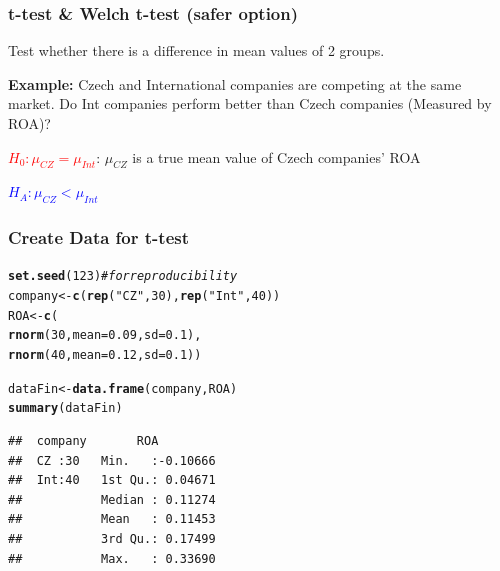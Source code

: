 \documentclass[12pt]{beamer}\usepackage[]{graphicx}\usepackage[]{color}
\makeatletter
\newcommand{\hlnum}[1]{\textcolor[rgb]{0.686,0.059,0.569}{#1}}%
\newcommand{\hlstr}[1]{\textcolor[rgb]{0.192,0.494,0.8}{#1}}%
\newcommand{\hlcom}[1]{\textcolor[rgb]{0.678,0.584,0.686}{\textit{#1}}}%
\newcommand{\hlstd}[1]{\textcolor[rgb]{0.345,0.345,0.345}{#1}}%
\newcommand{\hlkwb}[1]{\textcolor[rgb]{0.69,0.353,0.396}{#1}}%
\newcommand{\hlkwc}[1]{\textcolor[rgb]{0.333,0.667,0.333}{#1}}%
\newcommand{\hlkwd}[1]{\textcolor[rgb]{0.737,0.353,0.396}{\textbf{#1}}}%
\newenvironment{kframe}{%
 \def\at@end@of@kframe{}%
 \ifinner\ifhmode%
  \def\at@end@of@kframe{\end{minipage}}%
  \begin{minipage}{\columnwidth}%
 \fi\fi%
 \def\FrameCommand##1{\hskip\@totalleftmargin \hskip-\fboxsep
 \colorbox{shadecolor}{##1}\hskip-\fboxsep
     \hskip-\linewidth \hskip-\@totalleftmargin \hskip\columnwidth}%
 \MakeFramed {\advance\hsize-\width
   \@totalleftmargin\z@ \linewidth\hsize
   \@setminipage}}%
 {\par\unskip\endMakeFramed%
 \at@end@of@kframe}
\newenvironment{knitrout}{}{} %
\makeatother
\begin{document}

\begin{frame}\large
\frametitle{t-test \& Welch t-test (safer option)}

Test whether there is a difference in mean values of 2 groups.\bigskip

\textbf{Example:} Czech and International companies are competing at the same market. Do Int companies perform better than Czech companies (Measured by ROA)? \smallskip{}


\textcolor{red}{$H_0: \mu_{CZ} = \mu_{Int}$}: $\mu_{CZ}$ is a true mean value of Czech companies' ROA \smallskip

\textcolor{blue}{$H_A: \mu_{CZ} < \mu_{Int}$}

\end{frame}


\begin{frame}[fragile]
\frametitle{Create Data for t-test}

\begin{knitrout}
\color{fgcolor}\begin{kframe}
\begin{alltt}
\hlkwd{set.seed}\hlstd{(}\hlnum{123}\hlstd{)} \hlcom{# for reproducibility}
\hlstd{company} \hlkwb{<-} \hlkwd{c}\hlstd{(}\hlkwd{rep}\hlstd{(}\hlstr{"CZ"}\hlstd{,} \hlnum{30}\hlstd{),} \hlkwd{rep}\hlstd{(}\hlstr{"Int"}\hlstd{,} \hlnum{40}\hlstd{) )}
\hlstd{ROA} \hlkwb{<-} \hlkwd{c}\hlstd{(}
 \hlkwd{rnorm}\hlstd{(}\hlnum{30}\hlstd{,} \hlkwc{mean}\hlstd{=}\hlnum{0.09}\hlstd{,} \hlkwc{sd}\hlstd{=}\hlnum{0.1}\hlstd{),}
 \hlkwd{rnorm}\hlstd{(}\hlnum{40}\hlstd{,} \hlkwc{mean}\hlstd{=}\hlnum{0.12}\hlstd{,} \hlkwc{sd}\hlstd{=}\hlnum{0.1}\hlstd{) )}

\hlstd{dataFin} \hlkwb{<-} \hlkwd{data.frame}\hlstd{(company, ROA)}
\hlkwd{summary}\hlstd{(dataFin)}
\end{alltt}
\begin{verbatim}
##  company       ROA          
##  CZ :30   Min.   :-0.10666  
##  Int:40   1st Qu.: 0.04671  
##           Median : 0.11274  
##           Mean   : 0.11453  
##           3rd Qu.: 0.17499  
##           Max.   : 0.33690
\end{verbatim}
\end{kframe}
\end{knitrout}

\end{frame}
\end{document}
